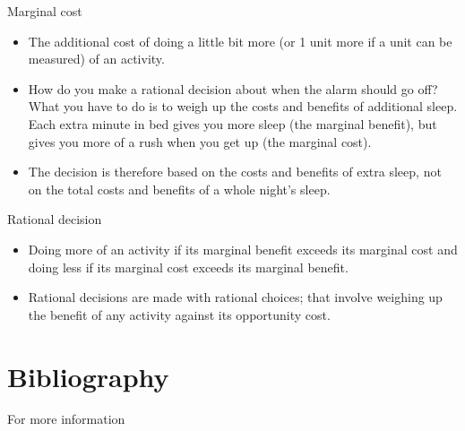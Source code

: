 \documentclass[12pt,ignorenonframetext,aspectratio=169]{beamer}
\providecommand{\tightlist}{%
  \setlength{\itemsep}{0pt}\setlength{\parskip}{0pt}}
\begin{document}
\begin{frame}{Marginal cost}
\protect\hypertarget{marginal-cost}{}

\begin{itemize}
\tightlist
\item
  The additional cost of doing a little bit more (or 1 unit more if a
  unit can be measured) of an activity.
\item
  How do you make a rational decision about when the alarm should go
  off? What you have to do is to weigh up the costs and benefits of
  additional sleep. Each extra minute in bed gives you more sleep (the
  marginal benefit), but gives you more of a rush when you get up (the
  marginal cost).
\item
  The decision is therefore based on the costs and benefits of extra
  sleep, not on the total costs and benefits of a whole night's sleep.
\end{itemize}

\begin{block}{Rational decision}

\begin{itemize}
\tightlist
\item
  Doing more of an activity if its marginal benefit exceeds its marginal
  cost and doing less if its marginal cost exceeds its marginal benefit.
\item
  Rational decisions are made with rational choices; that involve
  weighing up the benefit of any activity against its opportunity cost.
\end{itemize}

\end{block}

\end{frame}

\hypertarget{bibliography}{%
\section{Bibliography}\label{bibliography}}

\begin{frame}{For more information}
\protect\hypertarget{for-more-information}{}

\end{frame}
\end{document}
